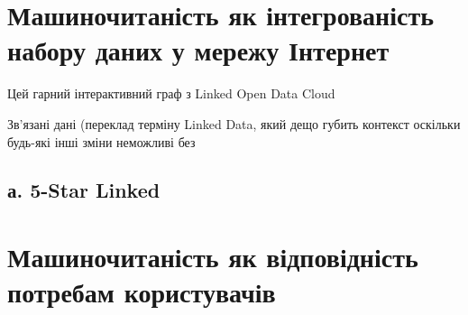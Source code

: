 \documentclass[
]{agujournal2019}
\begin{document}
\section{Машиночитаність як інтегрованість набору даних у мережу
Інтернет}\label{ux43cux430ux448ux438ux43dux43eux447ux438ux442ux430ux43dux456ux441ux442ux44c-ux44fux43a-ux456ux43dux442ux435ux433ux440ux43eux432ux430ux43dux456ux441ux442ux44c-ux43dux430ux431ux43eux440ux443-ux434ux430ux43dux438ux445-ux443-ux43cux435ux440ux435ux436ux443-ux456ux43dux442ux435ux440ux43dux435ux442}

Цей гарний інтерактивний граф з Linked Open Data Cloud

Зв'язані дані (переклад терміну Linked Data, який дещо губить контекст
оскільки будь-які інші зміни неможливі без

\subsection{а. 5-Star Linked}\label{ux430.-5-star-linked}

\section{Машиночитаність як відповідність потребам
користувачів}\label{sec-data-methods}
\end{document}
